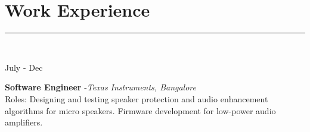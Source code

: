 \documentclass[10pt]{article}
\newcommand\vtick{\textquotesingle}
\begin{document}



\vspace{0.3cm}
\section*{\color{black} Work Experience}

\noindent\textcolor{black}{\rule{\textwidth}{1.5pt}} \vspace{-0.2cm}\\
\begin{minipage}[t]{.2\textwidth}
July\vtick19 - Dec\vtick20
\end{minipage}
\begin{minipage}[t]{0.8\textwidth}
{\bf Software Engineer }-{\it Texas Instruments, Bangalore}\\
Roles: Designing and testing speaker protection and audio enhancement algorithms for micro speakers. Firmware development for low-power audio amplifiers.
\end{minipage}
\end{document}
